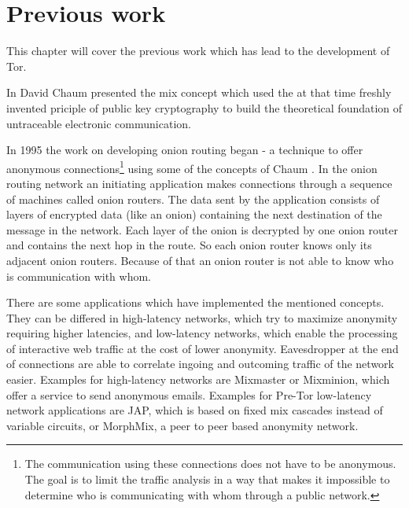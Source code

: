 



\section{Previous work}

This chapter will cover the previous work which has lead to the development of Tor.

In \cite{chaum1981untraceable} David Chaum presented the mix concept which used the at that time freshly invented priciple of public key cryptography to build the theoretical foundation of untraceable electronic communication.

In 1995 the work on developing onion routing began - a technique to offer anonymous connections\footnote{
	The communication using these connections does not have to be anonymous. The goal is to limit the traffic analysis in a way that makes it impossible to determine who is communicating with whom through a public network.
} using some of the concepts of Chaum \cite{onionroutingproject, goldschlag1996hiding, reed1998anonymous}. In the onion routing network an initiating application makes connections through a sequence of machines called onion routers. The data sent by the application consists of layers of encrypted data (like an onion) containing the next destination of the message in the network. Each layer of the onion is decrypted by one onion router and contains the next hop in the route. So each onion router knows only its adjacent onion routers. Because of that an onion router is not able to know who is communication with whom. 


There are some applications which have implemented the mentioned concepts. They can be differed in high-latency networks, which try to maximize anonymity requiring higher latencies, and low-latency networks, which enable the processing of interactive web traffic at the cost of lower anonymity. Eavesdropper at the end of connections are able to correlate ingoing and outcoming traffic of the network easier. Examples for high-latency networks are Mixmaster or Mixminion, which offer a service to send anonymous emails. Examples for Pre-Tor low-latency network applications are JAP, which is based on fixed mix cascades instead of variable circuits, or MorphMix, a peer to peer based anonymity network.


